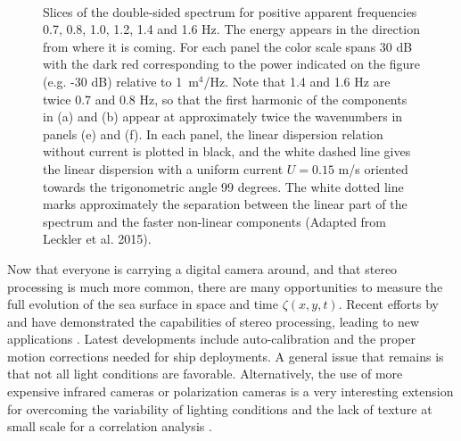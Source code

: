 \begin{figure}[htb]
  \\
  \caption{Slices of the double-sided spectrum for positive apparent frequencies 0.7, 0.8, 1.0, 1.2, 1.4 and 1.6 Hz. The energy appears in the direction from 
           where it is coming. For each panel the color scale spans 30 dB with the dark red corresponding to the power indicated on 
the figure (e.g. -30 dB) relative to 1~m$^4$/Hz. Note that 1.4 and 1.6 Hz are twice 0.7 and 0.8 Hz, so that the first harmonic of the components in (a) and (b) 
           appear at approximately twice the wavenumbers in panels (e) and (f). In each panel, the linear dispersion relation without current is plotted in black, and the  white dashed line gives the linear dispersion with a uniform current $U= 0.15$ m/s oriented towards the trigonometric angle 99 degrees. The white dotted  line marks approximately the separation between 
the linear part of the spectrum and the faster non-linear components (Adapted from Leckler et al. 2015). } \label{fig:kxky}
\end{figure}
Now that everyone is carrying a digital camera around, and that stereo processing is much more common, there are many opportunities 
to measure the full evolution  of the sea surface in space and time $\zeta(x,y,t)$. Recent efforts by \cite{Benetazzo2006} and \cite{Gallego&al.2011} 
have demonstrated the capabilities of stereo processing, leading to new applications \citep{Fedele&al.2013,Leckler&al.2015}. Latest developments include  
auto-calibration and the proper motion corrections needed for ship deployments. A general issue that remains is that not all light conditions are favorable. Alternatively, the use of 
more expensive infrared cameras or polarization cameras is a very interesting extension for overcoming the variability of lighting conditions and 
the lack of texture at small scale 
for a correlation analysis \citep{Sutherland&Melville2013,Laxague&al.2015}.

